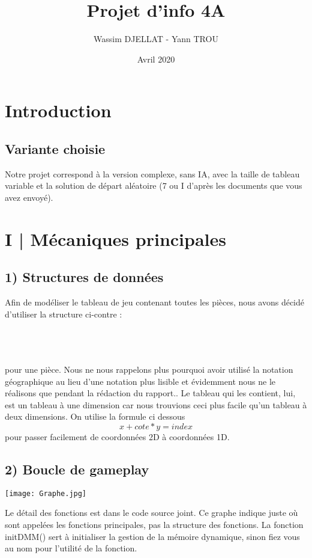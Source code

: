 \documentclass{report}
\title{Projet d'info 4A}
\author{Wassim DJELLAT - Yann TROU}
\date{Avril 2020}
\begin{document}
\maketitle
\section*{Introduction}

\subsection*{Variante choisie}
Notre projet correspond à la version complexe, sans IA, avec la taille de tableau variable et la solution de départ aléatoire (7 ou I d'après les documents que vous avez envoyé).
 
\section*{I | Mécaniques principales}
\subsection*{1) Structures de données}
Afin de modéliser le tableau de jeu contenant toutes les pièces, nous avons décidé d'utiliser la structure ci-contre : 
\\
\\
\begin{center}
 
\end{center}
\\
\\
pour une pièce. 
Nous ne nous rappelons plus pourquoi avoir utilisé la notation géographique au lieu d'une notation plus lisible et évidemment nous ne le réalisons que pendant la rédaction du rapport.. Le tableau qui les contient, lui, est un tableau à une dimension car nous trouvions ceci plus facile qu'un tableau à deux dimensions.
On utilise la formule ci dessous
\[ x + cote * y = index \]
pour passer facilement de coordonnées 2D à coordonnées 1D.

\subsection*{2) Boucle de gameplay}
\begin{center}
\texttt{[image: Graphe.jpg]}
\end{center}

Le détail des fonctions est dans le code source joint. Ce graphe indique juste où sont appelées les fonctions principales, pas la structure des fonctions. La fonction initDMM() sert à initialiser la gestion de la mémoire dynamique, sinon fiez vous au nom pour l'utilité de la fonction.
\end{document}
